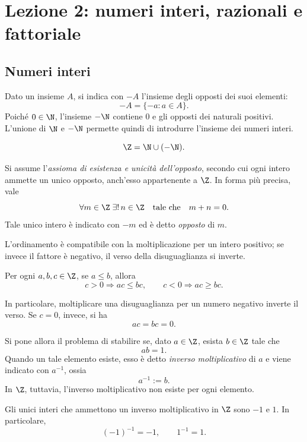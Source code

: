 \chapter[Lezione 2 --- 30 settembre 2026]{Lezione 2: numeri interi, razionali e fattoriale}
\label{chap:lezione-02}

\section{Numeri interi}
\label{sec:lez02-numeri-interi}

Dato un insieme \(A\), si indica con \(-A\) l'insieme degli opposti dei
suoi elementi:
\[
  -A=\{-a:a\in A\}.
\]
Poiché \(0\in\N\), l'insieme \(-\N\) contiene \(0\) e gli opposti dei
naturali positivi. L'unione di \(\N\) e \(-\N\) permette quindi di
introdurre l'insieme dei numeri interi.

\begin{definition}
\label{def:numeri-interi}
\[
  \Z=\N\cup(-\N).
\]
\end{definition}

Si assume l'\emph{assioma di esistenza e unicità dell'opposto}, secondo cui
ogni intero ammette un unico opposto, anch'esso appartenente a \(\Z\). In
forma più precisa, vale
\[
  \forall m\in\Z\;\exists!\,n\in\Z
  \quad\text{tale che}\quad
  m+n=0.
\]
Tale unico intero è indicato con \(-m\) ed è detto \emph{opposto} di \(m\).

L'ordinamento è compatibile con la moltiplicazione per un intero positivo;
se invece il fattore è negativo, il verso della disuguaglianza si inverte.

\begin{proposition}
\label{prop:compatibilita-ordine-interi}
Per ogni \(a,b,c\in\Z\), se \(a\le b\), allora
\[
  c>0\Longrightarrow ac\le bc,
  \qquad
  c<0\Longrightarrow ac\ge bc.
\]
\end{proposition}

In particolare, moltiplicare una disuguaglianza per un numero negativo
inverte il verso. Se \(c=0\), invece, si ha
\[
  ac=bc=0.
\]

Si pone allora il problema di stabilire se, dato \(a\in\Z\), esista
\(b\in\Z\) tale che
\[
  ab=1.
\]
Quando un tale elemento esiste, esso è detto \emph{inverso moltiplicativo}
di \(a\) e viene indicato con \(a^{-1}\), ossia
\[
  a^{-1}:=b.
\]
In \(\Z\), tuttavia, l'inverso moltiplicativo non esiste per ogni elemento.

\begin{proposition}
\label{prop:inversi-interi}
Gli unici interi che ammettono un inverso moltiplicativo in \(\Z\) sono
\(-1\) e \(1\). In particolare,
\[
  (-1)^{-1}=-1,
  \qquad
  1^{-1}=1.
\]
\end{proposition}


